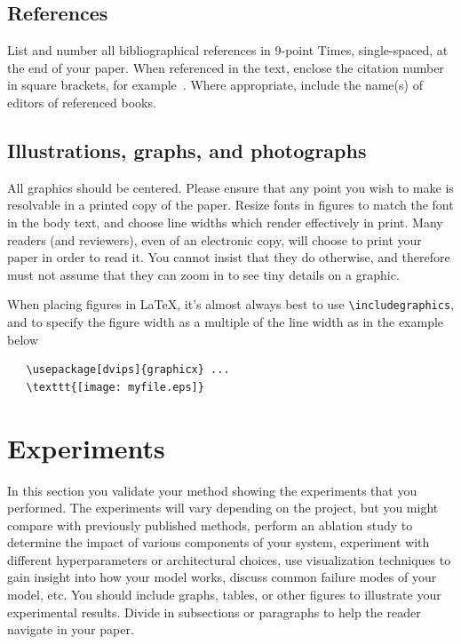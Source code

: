 \documentclass[10pt,twocolumn,letterpaper]{article}
\begin{document}
\subsection{References}
List and number all bibliographical references in 9-point Times,
single-spaced, at the end of your paper. When referenced in the text,
enclose the citation number in square brackets, for
example~\cite{Authors14}.  Where appropriate, include the name(s) of
editors of referenced books.
\subsection{Illustrations, graphs, and photographs}
All graphics should be centered.  Please ensure that any point you wish to
make is resolvable in a printed copy of the paper.  Resize fonts in figures
to match the font in the body text, and choose line widths which render
effectively in print.  Many readers (and reviewers), even of an electronic
copy, will choose to print your paper in order to read it.  You cannot
insist that they do otherwise, and therefore must not assume that they can
zoom in to see tiny details on a graphic.

When placing figures in \LaTeX, it's almost always best to use
\verb+\includegraphics+, and to specify the  figure width as a multiple of
the line width as in the example below
{\small\begin{verbatim}
   \usepackage[dvips]{graphicx} ...
   \texttt{[image: myfile.eps]}
\end{verbatim}
}

\section{Experiments}
In this section you validate your method showing the experiments that you performed. The experiments will vary depending on the project, but you might compare with previously published methods, perform an ablation study to determine the impact of various components of your system, experiment with different hyperparameters or architectural choices, use visualization techniques to gain insight into how your model works, discuss common failure modes of your model, etc. You should include graphs, tables, or other figures to illustrate your experimental results. Divide in subsections or paragraphs to help the reader navigate in your paper.
\end{document}
